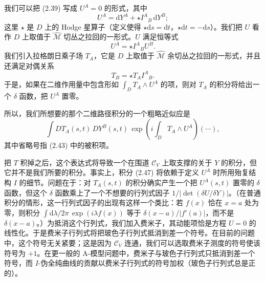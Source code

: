 \documentclass[11pt,a4paper,UTF8]{ctexart}
\theoremstyle{plain}
\theoremstyle{definition}
\begin{document}
我们可以把 (2.39) 写成 $U^A=0$ 的形式，其中
\begin{equation}
    U^A=\mathrm{d}Y^A+\star I^A{}_B\,\mathrm{d}Y^B;
    \tag{2.44}
\end{equation}
这里 $\star$ 是 $D$ 上的 Hodge 星算子（定义使得 $\star\mathrm{d}s=\mathrm{d}t$，$\star\mathrm{d}t=-\mathrm{d}s$）。我们把 $U$ 看作 $D$ 上取值于 $\widehat{\mathcal{M}}$ 切丛之拉回的一形式。$U$ 满足恒等式
\begin{equation}
    U^A=\star I^A{}_B U^B.
    \tag{2.45}
\end{equation}
我们引入拉格朗日乘子场 $T_A$，它是 $D$ 上取值于 $\widehat{\mathcal{M}}$ 余切丛之拉回的一形式，并且还满足对偶关系
\begin{equation}
    T_B=\star T_A I^A{}_B.
    \tag{2.46}
\end{equation}
于是，如果在二维作用量中包含形如 $\int_D T_A\wedge U^A$ 的项，则对 $T_A$ 的积分将给出一个 $\delta$ 函数，把 $U^A$ 置零。


所以，我们所想要的那个二维路径积分的一个粗略近似应是
\begin{equation}
    \int DT_A(s,t)\,DY^B(s,t)\,\exp\left(i\int_D T_A\wedge U^A\right)(\cdots),
    \tag{2.47}
\end{equation}
其中省略号指 (2.43) 中的被积项。

把 $T$ 积掉之后，这个表达式将导致一个在围道 $\mathcal{C}_V$ 上取支撑的关于 $Y$ 的积分，但它并不是我们所要的积分。事实上，积分 (2.47) 将依赖于定义 $U^A$ 时所用殆复结构 $I$ 的细节。问题在于：对 $T_A(s,t)$ 的积分确实产生一个把 $U^A(s,t)$ 置零的 $\delta$ 函数，但这个 $\delta$ 函数乘上了一个不想要的行列式因子 $1/\left|\det(\delta U/\delta Y)\right|$。（在普通积分的情形，这一行列式因子的出现有这样一个类比：若 $f(x)$ 恰在 $x=a$ 处为零，则积分 $\int \mathrm{d}\lambda/2\pi\,\exp(i\lambda f(x))$ 等于 $\delta(x-a)/|f'(a)|$，而不是 $\delta(x-a)$。）为抵消这个行列式，我们加入费米子，其动能项恰是方程 $U=0$ 的线性化。于是费米子行列式将把玻色子行列式抵消到差一个符号。在目前的问题中，这个符号无关紧要；这是因为 $\mathcal{C}_V$ 连通，我们可以选取费米子测度的符号使该符号为 $+1$。在更一般的 A-模型问题中，费米子与玻色子行列式只抵消到差一个符号，而 $I$-伪全纯曲线的贡献以费米子行列式的符号加权（玻色子行列式总是正的）。
\end{document}
